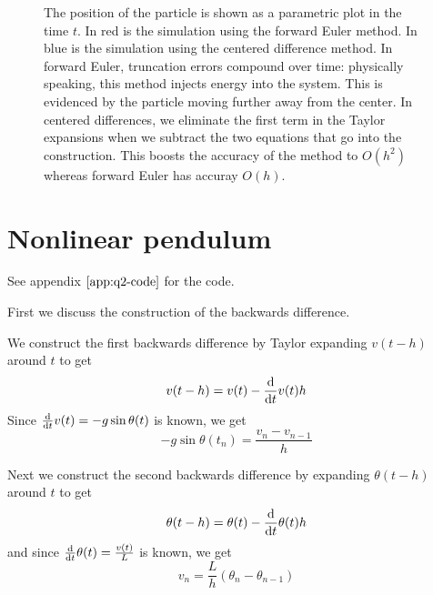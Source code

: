 \documentclass[11pt,letterpaper]{article}
\begin{document}
\begin{figure}[ht]
  \centering
  \caption{%
    The position of the particle is shown as a parametric plot in the time
    $t$.
    In red is the simulation using the forward Euler method. In blue is the
    simulation using the centered difference method.
    In forward Euler, truncation errors compound over time: physically
    speaking, this method injects energy into the system. This is evidenced
    by the particle moving further away from the center.
    In centered differences, we eliminate the first term in the Taylor
    expansions when we subtract the two equations that go into the
    construction. This boosts the accuracy of the method to $O(h^2)$ whereas
    forward Euler has accuray $O(h)$.%
  }
  \label{fig:q1}
\end{figure}

\section{Nonlinear pendulum}

See appendix $\ref{app:q2-code}$ for the code.

First we discuss the construction of the backwards difference.

We construct the first backwards difference by Taylor expanding $v(t - h)$
around $t$ to get
%
\begin{equation*}
  v(t - h) = v(t) - \frac{\mathrm{d} }{\mathrm{d} t} v(t) h
\end{equation*}
%
Since $\frac{\mathrm{d} }{\mathrm{d} t} v(t) = -g \sin \theta(t)$ is known, we get
%
\begin{equation}
  \label{eq:deriv-1}
  - g \sin \theta(t_n) = \frac{v_n - v_{n-1}}{h}
\end{equation}

Next we construct the second backwards difference by expanding $\theta(t - h)$
around $t$ to get
%
\begin{equation*}
  \theta(t - h) = \theta(t) - \frac{\mathrm{d} }{\mathrm{d} t} \theta(t) h
\end{equation*}
%
and since $\frac{\mathrm{d} }{\mathrm{d} t} \theta(t) = \frac{v(t)}{L}$ is known, we get
%
\begin{equation}
  \label{eq:deriv-2}
  v_n = \frac{L}{h}(\theta_n - \theta_{n-1})
\end{equation}
\end{document}
